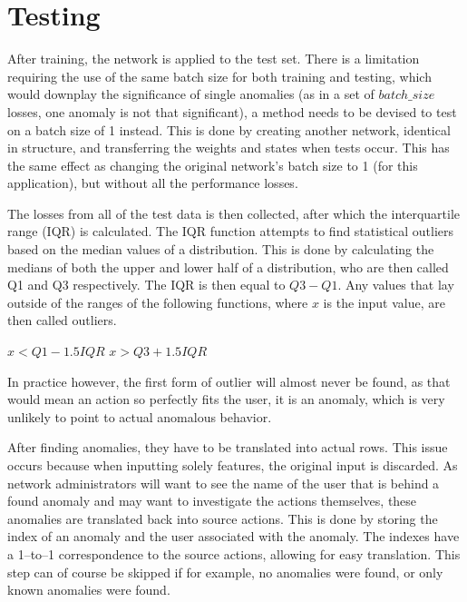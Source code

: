 \section{Testing}
After training, the network is applied to the test set. There is a limitation requiring the use of the same batch size for both training and testing, which would downplay the significance of single anomalies (as in a set of \(batch\_size\) losses, one anomaly is not that significant), a method needs to be devised to test on a batch size of 1 instead. This is done by creating another network, identical in structure, and transferring the weights and states when tests occur. This has the same effect as changing the original network's batch size to 1 (for this application), but without all the performance losses.

The losses from all of the test data is then collected, after which the interquartile range (IQR) is calculated. The IQR function attempts to find statistical outliers based on the median values of a distribution. This is done by calculating the medians of both the upper and lower half of a distribution, who are then called Q1 and Q3 respectively. The IQR is then equal to \(Q3 - Q1\). Any values that lay outside of the ranges of the following functions, where \(x\) is the input value, are then called outliers.

\( x < Q1 - 1.5 IQR \)
\( x > Q3 + 1.5 IQR \)

In practice however, the first form of outlier will almost never be found, as that would mean an action so perfectly fits the user, it is an anomaly, which is very unlikely to point to actual anomalous behavior.

After finding anomalies, they have to be translated into actual rows. This issue occurs because when inputting solely features, the original input is discarded. As network administrators will want to see the name of the user that is behind a found anomaly and may want to investigate the actions themselves, these anomalies are translated back into source actions. This is done by storing the index of an anomaly and the user associated with the anomaly. The indexes have a 1--to--1 correspondence to the source actions, allowing for easy translation. This step can of course be skipped if for example, no anomalies were found, or only known anomalies were found.

